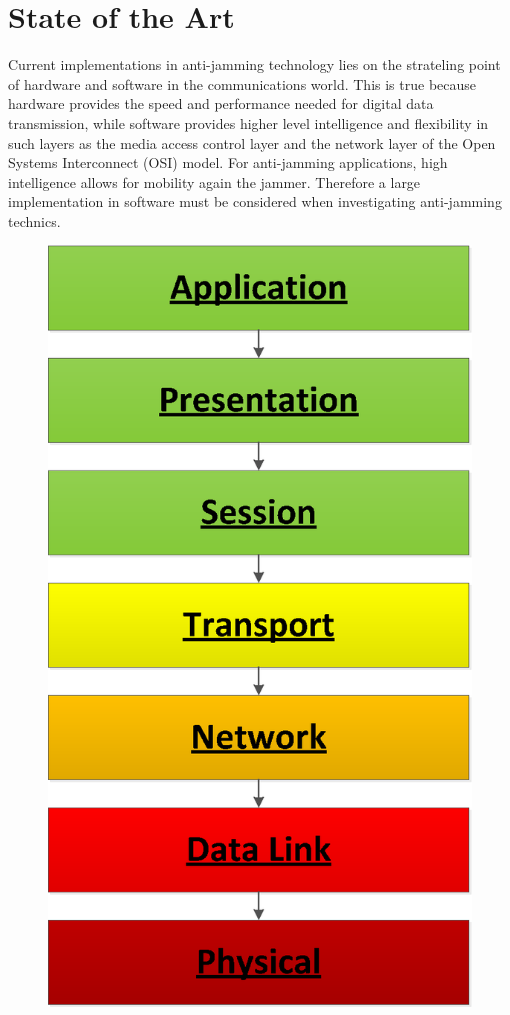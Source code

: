 \section{State of the Art}

Current implementations in anti-jamming technology lies on the strateling point of hardware and software in the communications world.  This is true because hardware provides the speed and performance needed for digital data transmission, while software provides higher level intelligence and flexibility in such layers as the media access control layer and the network layer of the Open Systems Interconnect (OSI) model\cite{Zimmermann}.  For anti-jamming applications, high intelligence allows for mobility again the jammer.  Therefore a large implementation in software must be considered when investigating anti-jamming technics.\\

\begin{figure}
\includegraphics[scale=0.10]{OSI_model.eps}
\end{figure}

